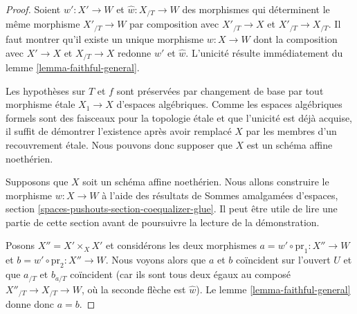 \begin{proof}
Soient $w' : X' \to W$ et $\hat w : X_{/T} \to W$ des morphismes
qui déterminent le même morphisme $X'_{/T} \to W$ par composition
avec $X'_{/T} \to X$ et $X'_{/T} \to X_{/T}$. Il faut montrer
qu'il existe un unique morphisme $w : X \to W$ dont la composition
avec $X' \to X$ et $X_{/T} \to X$ redonne $w'$ et $\hat w$.
L'unicité résulte immédiatement du lemme \ref{lemma-faithful-general}.

\medskip\noindent
Les hypothèses sur $T$ et $f$ sont préservées par changement de base
par tout morphisme étale $X_1 \to X$ d'espaces algébriques.
Comme les espaces algébriques formels sont des faisceaux pour la
topologie étale et que l'unicité est déjà acquise,
il suffit de démontrer l'existence après avoir remplacé $X$ par
les membres d'un recouvrement étale. Nous pouvons donc supposer que $X$
est un schéma affine noethérien.

\medskip\noindent
Supposons que $X$ soit un schéma affine noethérien. Nous allons construire
le morphisme $w : X \to W$ à l'aide des résultats de
Sommes amalgamées d'espaces, section
\ref{spaces-pushouts-section-coequalizer-glue}.
Il peut être utile de lire une partie de cette section avant de poursuivre
la lecture de la démonstration.

\medskip\noindent
Posons $X'' = X' \times_X X'$ et considérons les deux morphismes
$a = w' \circ \text{pr}_1 : X'' \to W$ et
$b = w' \circ \text{pr}_2 : X'' \to W$.
Nous voyons alors que $a$ et $b$ coïncident sur l'ouvert $U$
et que $a_{/T}$ et $b_{a/T}$ coïncident (car ils sont
tous deux égaux au composé $X''_{/T} \to X_{/T} \to W$,
où la seconde flèche est $\hat w$).
Le lemme \ref{lemma-faithful-general} donne donc
$a = b$.


\end{proof}
